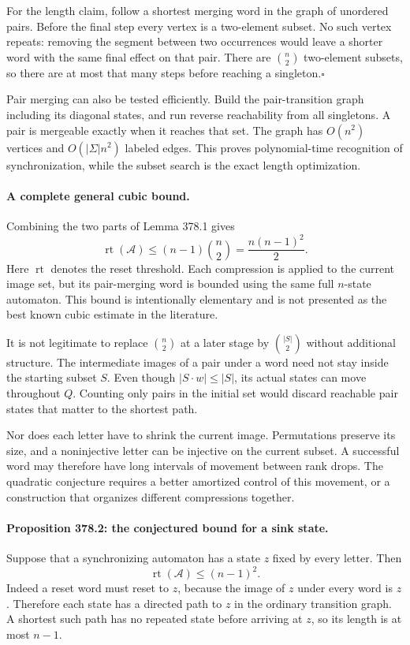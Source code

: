 \documentclass[11pt]{article}
\begin{document}
For the length claim, follow a shortest merging word in the graph of unordered pairs. Before the final step every vertex is a two-element subset. No such vertex repeats: removing the segment between two occurrences would leave a shorter word with the same final effect on that pair. There are $\binom n2$ two-element subsets, so there are at most that many steps before reaching a singleton.\hfill$\square$

Pair merging can also be tested efficiently. Build the pair-transition graph including its diagonal states, and run reverse reachability from all singletons. A pair is mergeable exactly when it reaches that set. The graph has $O(n^2)$ vertices and $O(|\Sigma|n^2)$ labeled edges. This proves polynomial-time recognition of synchronization, while the subset search is the exact length optimization.

\paragraph{A complete general cubic bound.}
Combining the two parts of Lemma 378.1 gives
\begin{equation}\label{a378:cubic}
                  \operatorname{rt}(\mathcal A)
                      \leq(n-1)\binom n2
                      =\frac{n(n-1)^2}{2}.
\end{equation}
Here $\operatorname{rt}$ denotes the reset threshold. Each compression is applied to the current image set, but its pair-merging word is bounded using the same full $n$-state automaton. This bound is intentionally elementary and is not presented as the best known cubic estimate in the literature.

It is not legitimate to replace $\binom n2$ at a later stage by $\binom{|S|}2$ without additional structure. The intermediate images of a pair under a word need not stay inside the starting subset $S$. Even though $|S\cdot w|\leq|S|$, its actual states can move throughout $Q$. Counting only pairs in the initial set would discard reachable pair states that matter to the shortest path.

Nor does each letter have to shrink the current image. Permutations preserve its size, and a noninjective letter can be injective on the current subset. A successful word may therefore have long intervals of movement between rank drops. The quadratic conjecture requires a better amortized control of this movement, or a construction that organizes different compressions together.

\paragraph{Proposition 378.2: the conjectured bound for a sink state.}
Suppose that a synchronizing automaton has a state $z$ fixed by every letter. Then
\[
                       \operatorname{rt}(\mathcal A)\leq(n-1)^2.
\]
Indeed a reset word must reset to $z$, because the image of $z$ under every word is $z$. Therefore each state has a directed path to $z$ in the ordinary transition graph. A shortest such path has no repeated state before arriving at $z$, so its length is at most $n-1$.
\end{document}
